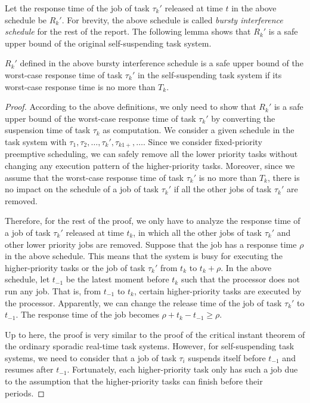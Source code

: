 Let the response time of the job of task $\tau_k'$ released at time $t$ in the above schedule be $R_k'$. For brevity, the above schedule is called \emph{bursty interference schedule} for the rest of the report. The following lemma shows that $R_k'$ is a safe upper bound of the original self-suspending task system. 

\begin{lemma}
\label{lemma:critical}
 $R_k'$ defined in the above bursty interference schedule is a safe upper bound of the worst-case response time of task $\tau_k'$ in the self-suspending task system if its worst-case response time is no more than $T_k$.
\end{lemma}
\begin{proof}
According to the above definitions, we only need to show that $R_k'$ is a safe upper bound of the worst-case response time of task $\tau_k'$ by converting the suspension time of task $\tau_k$ as computation. We consider a given schedule in the task system with $\tau_1, \tau_2, \ldots, \tau_k', \tau_{k1+}, \ldots$. Since we consider fixed-priority preemptive scheduling, we can safely remove all the lower priority tasks without changing any execution pattern of the higher-priority tasks. Moreover, since we assume that the worst-case response time of task $\tau_k'$ is no more than $T_k$, there is no impact on the schedule of a job of task $\tau_k'$ if all the other jobs of task $\tau_k'$ are removed. 


Therefore, for the rest of the proof, we only have to analyze the response time of a job of task $\tau_k'$ released at time $t_k$, in which all the other jobs of task $\tau_k'$ and other lower priority jobs are removed. Suppose that the job has a response time $\rho$ in the above schedule. This means that the system is busy for executing the higher-priority tasks or the job of task $\tau_k'$ from $t_k$ to $t_k+\rho$. In the above schedule, let $t_{-1}$ be the latest moment before $t_k$ such that the processor does not run any job. That is, from $t_{-1}$ to $t_k$, certain higher-priority tasks are executed by the processor. Apparently, we can change the release time of the job of task $\tau_k'$ to $t_{-1}$. The response time of the job becomes $\rho+t_k-t_{-1} \geq \rho$. 

Up to here, the proof is very similar to the proof of the critical instant theorem of the ordinary sporadic real-time task systems. However, for self-suspending task systems, we need to consider that a job of task $\tau_i$ suspends itself before $t_{-1}$ and resumes after $t_{-1}$.  Fortunately, each higher-priority task only has such a job due to the assumption that the higher-priority tasks can finish before their periods. 


\end{proof}
  
  

  
  
  
  
  
  
  